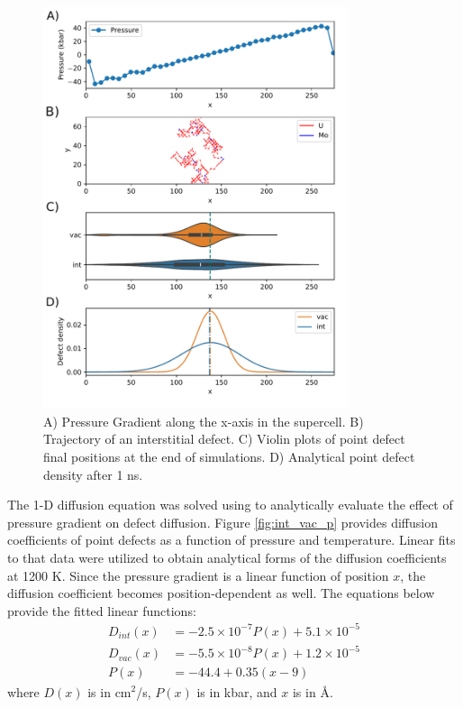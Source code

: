 \documentclass[review]{elsarticle}
\begin{document}
\begin{figure}[h!]
\centering
\includegraphics[width=0.8\textwidth]{PrGrad.pdf}
\caption{A) Pressure Gradient along the x-axis in the supercell. B) Trajectory of an interstitial defect. C) Violin plots of point defect final positions at the end of simulations. D) Analytical point defect density after 1 ns.}
\label{fig:diff}
\end{figure}


The 1-D diffusion equation was solved using  to analytically evaluate the effect of pressure gradient on defect diffusion. Figure \ref{fig:int_vac_p} provides diffusion coefficients of point defects as a function of pressure and temperature. Linear fits to that data were utilized to obtain analytical forms of the diffusion coefficients at 1200 K. Since the pressure gradient is a linear function of position $x$, the diffusion coefficient becomes position-dependent as well. The equations below provide the fitted linear functions:
\begin{align}
    D_{int}(x) &= -2.5 \times 10^{-7} P(x) + 5.1 \times 10^{-5} \\
    D_{vac}(x) &= -5.5 \times 10^{-8} P(x) + 1.2 \times 10^{-5} \\
    P(x) &= -44.4 + 0.35 (x - 9)
\end{align}
where $D(x)$ is in cm$^2$/s, $P(x)$ is in kbar, and $x$ is in \r{A}.
\end{document}
